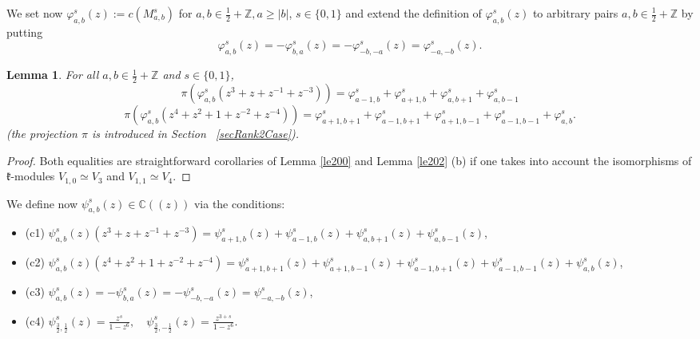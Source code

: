 \documentclass[12pt]{amsart}
\theoremstyle{plain} %
\newtheorem{lemma}[definition]{Lemma}
\newcommand {\ZZ} {\mathbb {Z}}
\newcommand {\CC} {\mathbb {C}}
\newcommand{\kk}{\mathfrak{k}}
\renewcommand{\phi}{\varphi}
\newcommand{\half}{\frac{1}{2}}
\newcommand{\threehalfs}{\frac{3}{2}}
\newcommand {\eqdef} {:=}
\newcommand{\refle}[1]{Lemma \ref{#1}}
\newcommand{\refsec}[1]{Section~ \ref{#1}}
\begin{document}
We set now $\phi_{a,b}^s(z)\eqdef c(M_{a,b}^s)$ for $a,b\in\half+\ZZ, a\geq|b|$, $s\in\{0,1\}$ and extend the definition of $\phi _{a,b}^s(z)$ to arbitrary pairs $a,b\in \half +\ZZ$ by putting
\begin{equation}\label{eqDelta}
\phi_{a,b}^s(z)=-\phi_{b,a}^s(z)=-\phi_{-b,-a}^s(z)=\phi_{-a,-b}^s(z).
\end{equation}

\begin {lemma}\label{le204}
For all $a,b\in \half+\ZZ$ and $s\in\{0,1\}$,
\[
\pi(\phi_{a,b}^s(z^3+z+z^{-1}+z^{-3}))=\phi_{a-1,b}^s+\phi_{a+1,b}^s+\phi_{a,b+1}^s+\phi_{a,b-1}^s
\]
\[
\pi(\phi_{a,b}^s(z^4+z^2+1+z^{-2}+z^{-4}))=\phi_{a+1,b+1}^s+\phi_{a-1,b+1}^s+\phi_{a+1,b-1}^s+\phi_{a-1,b-1}^s+\phi_{a,b}^s.
\]
(the projection $\pi$ is introduced in \refsec{secRank2Case}).
\end{lemma}
\begin{proof}
Both equalities are straightforward corollaries of \refle{le200} and \refle{le202} (b) if one takes into account the isomorphisms of $\kk$-modules $V_{1,0}\simeq V_3$ and $V_{1,1}\simeq V_4$.
\end{proof}

We define now $\psi_{a,b}^s(z)\in \CC((z))$ via the conditions:
\begin {itemize}
\item[(c1)]$\displaystyle\psi_{a,b}^s(z)(z^3+z+z^{-1}+z^{-3})=\psi_{a+1,b}^s(z)+\psi_{a-1,b}^s(z)+\psi_{a,b+1}^s(z)+\psi_{a,b-1}^s(z)$,
\item[(c2)]$\displaystyle\psi_{a,b}^s(z)(z^4+z^2+1+z^{-2}+z^{-4})=\psi_{a+1,b+1}^s(z)+\psi_{a+1,b-1}^s(z)+\psi_{a-1,b+1}^s(z)+\psi_{a-1,b-1}^s(z)+\psi_{a,b}^s(z)$,
\item[(c3)]$\displaystyle\psi_{a,b}^s(z)=-\psi_{b,a}^s(z)=-\psi_{-b,-a}^s(z)=\psi_{-a,-b}^s(z)$,
\item[(c4)]$\displaystyle\psi_{\threehalfs,\half}^s(z)=\frac{z^s}{1-z^6}, \quad \psi_{\threehalfs,-\half}^{s}(z)=\frac{z^{3+s}}{1-z^6}$.
\end{itemize}
\end{document}
